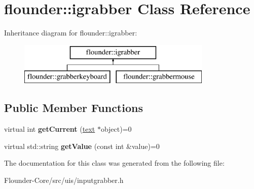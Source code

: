 \hypertarget{classflounder_1_1igrabber}{}\section{flounder\+:\+:igrabber Class Reference}
\label{classflounder_1_1igrabber}
Inheritance diagram for flounder\+:\+:igrabber\+:\begin{figure}[H]
\begin{center}
\leavevmode
\includegraphics[height=2.000000cm]{classflounder_1_1igrabber}
\end{center}
\end{figure}
\subsection*{Public Member Functions}
\begin{DoxyCompactItemize}
\item 
\mbox{\label{classflounder_1_1igrabber_aeb322a326b59e5b04d02e51b450eb062}} 
virtual int {\bfseries get\+Current} (\hyperlink{classflounder_1_1text}{text} $\ast$object)=0
\item 
\mbox{\label{classflounder_1_1igrabber_ac1940cd39641d67cba4417b81776bc26}} 
virtual std\+::string {\bfseries get\+Value} (const int \&value)=0
\end{DoxyCompactItemize}


The documentation for this class was generated from the following file\+:\begin{DoxyCompactItemize}
\item 
Flounder-\/\+Core/src/uis/inputgrabber.\+h\end{DoxyCompactItemize}
